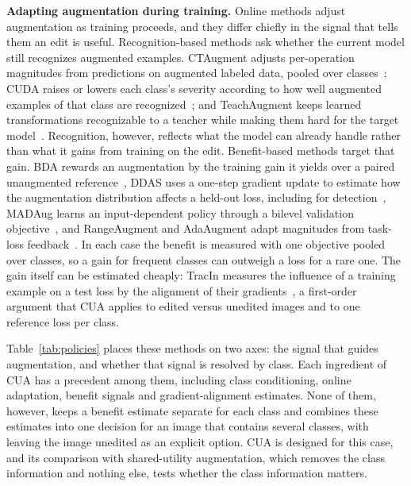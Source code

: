 \noindent\textbf{Adapting augmentation during training.} Online methods adjust augmentation as training proceeds, and they differ chiefly in the signal that tells them an edit is useful. Recognition-based methods ask whether the current model still recognizes augmented examples. CTAugment adjusts per-operation magnitudes from predictions on augmented labeled data, pooled over classes~\cite{berthelot2020}; CUDA raises or lowers each class's severity according to how well augmented examples of that class are recognized~\cite{ahn2023cuda}; and TeachAugment keeps learned transformations recognizable to a teacher while making them hard for the target model~\cite{suzuki2022teach}. Recognition, however, reflects what the model can already handle rather than what it gains from training on the edit. Benefit-based methods target that gain. BDA rewards an augmentation by the training gain it yields over a paired unaugmented reference~\cite{lu2023bda}, DDAS uses a one-step gradient update to estimate how the augmentation distribution affects a held-out loss, including for detection~\cite{liu2021ddas}, MADAug learns an input-dependent policy through a bilevel validation objective~\cite{hou2023madaug}, and RangeAugment and AdaAugment adapt magnitudes from task-loss feedback~\cite{mehta2022rangeaugment,yang2025adaaugment}. In each case the benefit is measured with one objective pooled over classes, so a gain for frequent classes can outweigh a loss for a rare one. The gain itself can be estimated cheaply: TracIn measures the influence of a training example on a test loss by the alignment of their gradients~\cite{pruthi2020tracin}, a first-order argument that CUA applies to edited versus unedited images and to one reference loss per class.

Table~\ref{tab:policies} places these methods on two axes: the signal that guides augmentation, and whether that signal is resolved by class. Each ingredient of CUA has a precedent among them, including class conditioning, online adaptation, benefit signals and gradient-alignment estimates. None of them, however, keeps a benefit estimate separate for each class and combines these estimates into one decision for an image that contains several classes, with leaving the image unedited as an explicit option. CUA is designed for this case, and its comparison with shared-utility augmentation, which removes the class information and nothing else, tests whether the class information matters.

